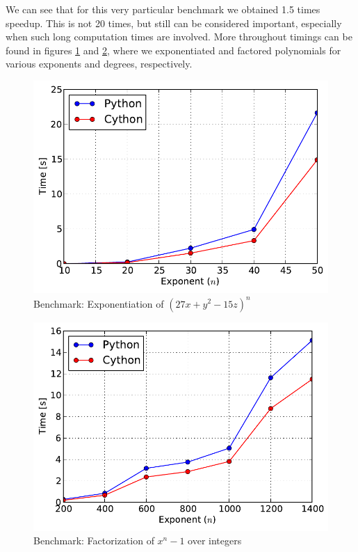 We can see that for this very particular benchmark we obtained 1.5 times speedup. This is
not 20 times, but still can be considered important, especially when such long computation
times are involved. More throughout timings can be found in figures \ref{fig-cython-power}
and \ref{fig-cython-factor}, where we exponentiated and factored polynomials for various
exponents and degrees, respectively.
\begin{figure}[htbp]
\centering

\includegraphics{cython-power.pdf}
\caption{Benchmark: Exponentiation of $(27 x + y^2 - 15 z)^n$\label{fig-cython-power}}\end{figure}
\begin{figure}[htbp]
\centering

\includegraphics{cython-factor.pdf}
\caption{Benchmark: Factorization of $x^n - 1$ over integers\label{fig-cython-factor}}\end{figure}

